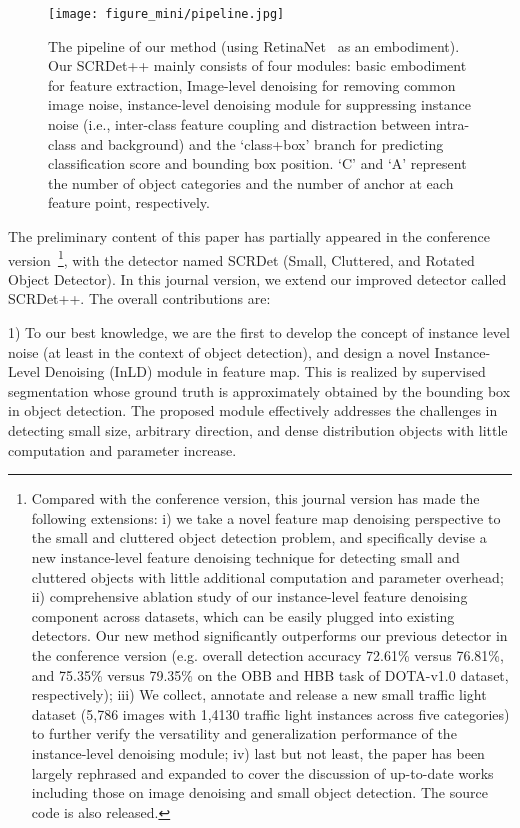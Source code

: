 \documentclass[10pt,journal,compsoc]{IEEEtran}
\begin{document}
\begin{figure*}[!tb]
	\begin{center}
		\texttt{[image: figure\_mini/pipeline.jpg]}
	\end{center}
\caption{The pipeline of our method (using RetinaNet~\cite{lin2017focal} as an embodiment). Our SCRDet++ mainly consists of four modules: basic embodiment for feature extraction, Image-level denoising for removing common image noise, instance-level denoising module for suppressing instance noise (i.e., inter-class feature coupling and distraction between intra-class and background) and the `class+box' branch for predicting classification score and bounding box position. `C' and `A' represent the number of object categories and the number of anchor at each feature point, respectively.}
	\label{fig:pipeline}
\end{figure*}

The preliminary content of this paper has partially appeared in the conference version~\cite{yang2019scrdet}\footnote{Compared with the conference version, this journal version has made the following extensions: i) we take a novel feature map denoising perspective to the small and cluttered object detection problem, and specifically devise a new instance-level feature denoising technique for detecting small and cluttered objects with little additional computation and parameter overhead; ii) comprehensive ablation study of our instance-level feature denoising component across datasets, which can be easily plugged into existing detectors. Our new method significantly outperforms our previous detector in the conference version (e.g. overall detection accuracy 72.61\% versus 76.81\%, and 75.35\% versus 79.35\% on the OBB and HBB task of DOTA-v1.0 dataset, respectively); iii) We collect, annotate and release a new small traffic light dataset (5,786 images with 1,4130 traffic light instances across five categories) to further verify the versatility and generalization performance of the instance-level denoising module; iv) last but not least, the paper has been largely rephrased and expanded to cover the discussion of up-to-date works including those on image denoising and small object detection. The source code is also released.}, with the detector named SCRDet (Small, Cluttered, and Rotated Object Detector). In this journal version, we extend our improved detector called SCRDet++. The overall contributions are:



1) To our best knowledge, we are the first to develop the concept of instance level noise (at least in the context of object detection), and design a novel Instance-Level Denoising (InLD) module in feature map. This is realized by supervised segmentation whose ground truth is approximately obtained by the bounding box in object detection. The proposed module effectively addresses the challenges in detecting small size, arbitrary direction, and dense distribution objects with little computation and parameter increase.
\end{document}
